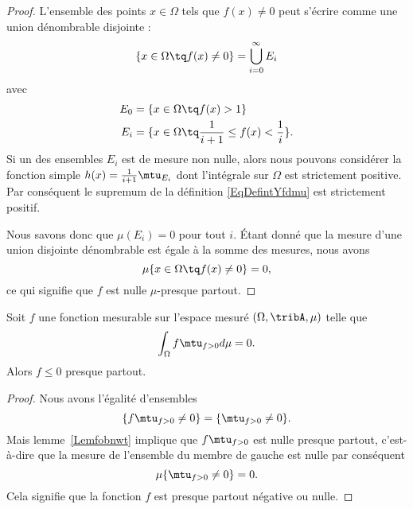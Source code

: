 \begin{proof}
    L'ensemble des points \( x\in\Omega\) tels que \( f(x)\neq 0\) peut s'écrire comme une union dénombrable disjointe :
    \begin{equation}
        \{ x\in\Omega\tq f(x)\neq 0 \}=\bigcup_{i=0}^{\infty}E_i
    \end{equation}
    avec
    \begin{subequations}
        \begin{align}
            E_0&=\{ x\in\Omega\tq f(x)>1 \}\\
            E_i&=\{ x\in\Omega\tq \frac{1}{ i+1 }\leq f(x)<\frac{1}{ i } \}.
        \end{align}
    \end{subequations}
    Si un des ensembles \( E_i\) est de mesure non nulle, alors nous pouvons considérer la fonction simple \( h(x)=\frac{1}{ i+1 }\mtu_{E_i}\) dont l'intégrale sur \( \Omega\) est strictement positive. Par conséquent le supremum de la définition \eqref{EqDefintYfdmu} est strictement positif.

    Nous savons donc que \( \mu(E_i)=0\) pour tout \( i\). Étant donné que la mesure d'une union disjointe dénombrable est égale à la somme des mesures, nous avons
    \begin{equation}
        \mu\{ x\in\Omega\tq f(x)\neq 0 \}=0,
    \end{equation}
    ce qui signifie que \( f\) est nulle \( \mu\)-presque partout.
\end{proof}

\begin{corollary}   \label{CorjLYiSm}
    Soit \( f\) une fonction mesurable sur l'espace mesuré \( (\Omega,\tribA,\mu)\) telle que
    \begin{equation}
        \int_{\Omega}f\mtu_{f>0}d\mu=0.
    \end{equation}
    Alors \( f\leq 0\) presque partout.
\end{corollary}

\begin{proof}
    Nous avons l'égalité d'ensembles
    \begin{equation}
        \{ f\mtu_{f>0}\neq 0 \}=\{ \mtu_{f>0}\neq 0 \}.
    \end{equation}
    Mais lemme~\ref{Lemfobnwt} implique que \( f\mtu_{f>0}\) est nulle presque partout, c'est-à-dire que la mesure de l'ensemble du membre de gauche est nulle par conséquent
    \begin{equation}
        \mu\{ \mtu_{f>0}\neq 0 \}=0.
    \end{equation}
    Cela signifie que la fonction \( f\) est presque partout négative ou nulle.
\end{proof}

